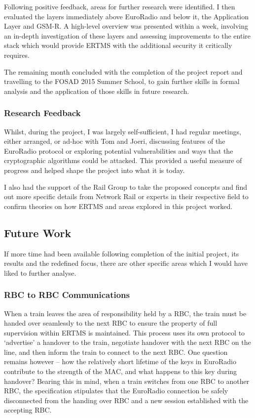 \documentclass[twoside,11pt,a4paper]{article}
\begin{document}
Following positive feedback, areas for further research were identified. I then evaluated the layers immediately above EuroRadio and below it, the Application Layer and GSM-R. A high-level overview was presented within a week, involving an in-depth investigation of these layers and assessing improvements to the entire stack which would provide ERTMS with the additional security it critically requires.

The remaining month concluded with the completion of the project report and travelling to the FOSAD 2015 Summer School, to gain further skills in formal analysis and the application of those skills in future research.

\subsubsection{Research Feedback}
Whilst, during the project, I was largely self-sufficient, I had regular meetings, either arranged, or ad-hoc with Tom and Joeri, discussing features of the EuroRadio protocol or exploring potential vulnerabilities and ways that the cryptographic algorithms could be attacked. This provided a useful measure of progress and helped shape the project into what it is today.

I also had the support of the Rail Group to take the proposed concepts and find out more specific details from Network Rail or experts in their respective field to confirm theories on how ERTMS and areas explored in this project worked.

\subsection{Future Work}
If more time had been available following completion of the initial project, its results and the redefined focus, there are other specific areas which I would have liked to further analyse.

\subsubsection{RBC to RBC Communications}
When a train leaves the area of responsibility held by a RBC, the train must be handed over seamlessly to the next RBC to ensure the property of full supervision within ERTMS is maintained. This process uses its own protocol to `advertise' a handover to the train, negotiate handover with the next RBC on the line, and then inform the train to connect to the next RBC. One question remains however -- how the relatively short lifetime of the keys in EuroRadio contribute to the strength of the MAC, and what happens to this key during handover? Bearing this in mind, when a train switches from one RBC to another RBC, the specification stipulates that the EuroRadio connection be safely disconnected from the handing over RBC and a new session established with the accepting RBC.
\end{document}
